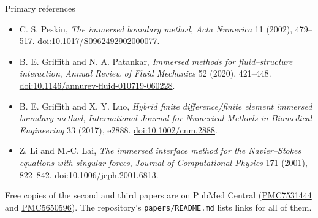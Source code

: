\documentclass[aspectratio=169,11pt]{beamer}
\begin{document}
\begin{frame}{Primary references}
\small
\begin{itemize}\itemsep7pt
  \item C. S. Peskin, \emph{The immersed boundary method}, \emph{Acta Numerica} 11 (2002), 479--517. \href{https://doi.org/10.1017/S0962492902000077}{doi:10.1017/S0962492902000077}.
  \item B. E. Griffith and N. A. Patankar, \emph{Immersed methods for fluid--structure interaction}, \emph{Annual Review of Fluid Mechanics} 52 (2020), 421--448. \href{https://doi.org/10.1146/annurev-fluid-010719-060228}{doi:10.1146/annurev-fluid-010719-060228}.
  \item B. E. Griffith and X. Y. Luo, \emph{Hybrid finite difference/finite element immersed boundary method}, \emph{International Journal for Numerical Methods in Biomedical Engineering} 33 (2017), e2888. \href{https://doi.org/10.1002/cnm.2888}{doi:10.1002/cnm.2888}.
  \item Z. Li and M.-C. Lai, \emph{The immersed interface method for the Navier--Stokes equations with singular forces}, \emph{Journal of Computational Physics} 171 (2001), 822--842. \href{https://doi.org/10.1006/jcph.2001.6813}{doi:10.1006/jcph.2001.6813}.
\end{itemize}
\begin{punchbox}
\small Free copies of the second and third papers are on PubMed Central (\href{https://pmc.ncbi.nlm.nih.gov/articles/PMC7531444/}{PMC7531444} and \href{https://pmc.ncbi.nlm.nih.gov/articles/PMC5650596/}{PMC5650596}). The repository's \texttt{papers/README.md} lists links for all of them.
\end{punchbox}
\end{frame}
\end{document}
